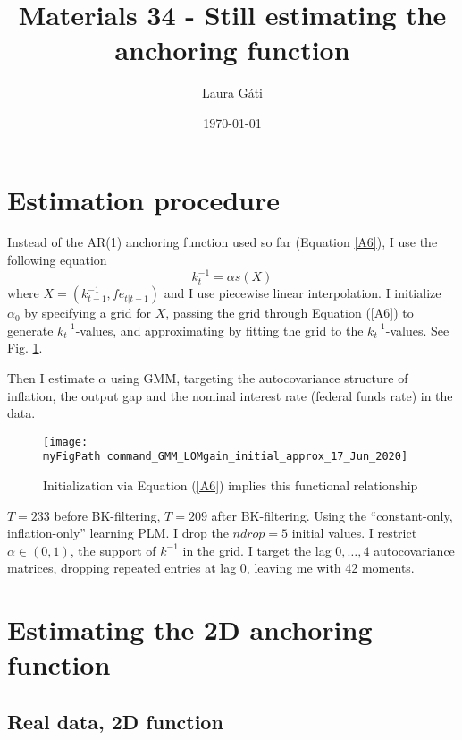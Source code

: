 \documentclass[11pt]{article}
\def \myFigPath {../../figures/}
\renewcommand{\[}{\begin{equation}}
\renewcommand{\]}{\end{equation}}
\begin{document}
\linespread{1.0}

\title{Materials 34 - Still estimating the anchoring function}
\author{Laura G\'ati} 
\date{\today}
\maketitle


\tableofcontents


\section{Estimation procedure}
Instead of the AR(1) anchoring function used so far (Equation \ref{A6}), I use the following equation
\begin{equation}
k_t^{-1} = \alpha s(X)
\end{equation}
where $X = (k^{-1}_{t-1}, fe_{t|t-1})$ and I use piecewise linear interpolation. I initialize $\alpha_0$ by specifying a grid for $X$, passing the grid through Equation (\ref{A6}) to generate $k^{-1}_t$-values, and approximating by fitting the grid to the $k^{-1}_t$-values.  See Fig. \ref{fig_initial_anchor_fct}.

Then I estimate $\alpha$ using GMM, targeting the autocovariance structure of inflation, the output gap and the nominal interest rate (federal funds rate) in the data. 

\begin{figure}[h!]
\texttt{[image: \\myFigPath command\_GMM\_LOMgain\_initial\_approx\_17\_Jun\_2020]}
\caption{Initialization via Equation (\ref{A6}) implies this functional relationship}
\label{fig_initial_anchor_fct}
\end{figure}

$T=233$ before BK-filtering, $T=209$ after BK-filtering. Using the ``constant-only, inflation-only'' learning PLM. I drop the $ndrop=5$ initial values. I restrict $\alpha \in (0,1)$, the support of $k^{-1}$ in the grid. I target the lag $0,\dots,4$ autocovariance matrices, dropping repeated entries at lag 0, leaving me with 42 moments.

\clearpage
\section{Estimating the 2D anchoring function}
\subsection{Real data, 2D function}
\end{document}
